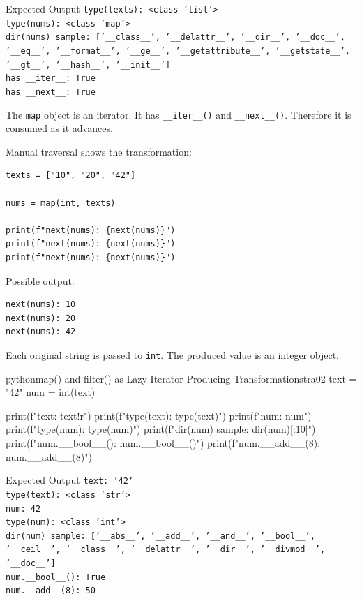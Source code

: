 \begin{iobox}{Expected Output}
\texttt{type(texts): <class 'list'>} \\
\texttt{type(nums): <class 'map'>} \\
\texttt{dir(nums) sample: ['\_\_class\_\_', '\_\_delattr\_\_', '\_\_dir\_\_', '\_\_doc\_\_',} \\
\texttt{'\_\_eq\_\_', '\_\_format\_\_', '\_\_ge\_\_', '\_\_getattribute\_\_', '\_\_getstate\_\_',} \\
\texttt{'\_\_gt\_\_', '\_\_hash\_\_', '\_\_init\_\_']} \\
\texttt{has \_\_iter\_\_: True} \\
\texttt{has \_\_next\_\_: True} \\
\end{iobox}


The \texttt{map} object is an iterator. It has \texttt{\_\_iter\_\_()} and \texttt{\_\_next\_\_()}. Therefore it is consumed as it advances.

Manual traversal shows the transformation:

\begin{verbatim}
texts = ["10", "20", "42"]

nums = map(int, texts)

print(f"next(nums): {next(nums)}")
print(f"next(nums): {next(nums)}")
print(f"next(nums): {next(nums)}")
\end{verbatim}

Possible output:

\begin{verbatim}
next(nums): 10
next(nums): 20
next(nums): 42
\end{verbatim}

Each original string is passed to \texttt{int}. The produced value is an integer object.

\begin{codebox}[]{python}{map() and filter() as Lazy Iterator-Producing Transformations}{tra02}
text = "42"
num = int(text)

print(f"text: {text!r}")
print(f"type(text): {type(text)}")
print(f"num: {num}")
print(f"type(num): {type(num)}")
print(f"dir(num) sample: {dir(num)[:10]}")
print(f"num.__bool__(): {num.__bool__()}")
print(f"num.__add__(8): {num.__add__(8)}")
\end{codebox}


\begin{iobox}{Expected Output}
\texttt{text: '42'} \\
\texttt{type(text): <class 'str'>} \\
\texttt{num: 42} \\
\texttt{type(num): <class 'int'>} \\
\texttt{dir(num) sample: ['\_\_abs\_\_', '\_\_add\_\_', '\_\_and\_\_', '\_\_bool\_\_',} \\
\texttt{'\_\_ceil\_\_', '\_\_class\_\_', '\_\_delattr\_\_', '\_\_dir\_\_', '\_\_divmod\_\_',} \\
\texttt{'\_\_doc\_\_']} \\
\texttt{num.\_\_bool\_\_(): True} \\
\texttt{num.\_\_add\_\_(8): 50} \\
\end{iobox}


